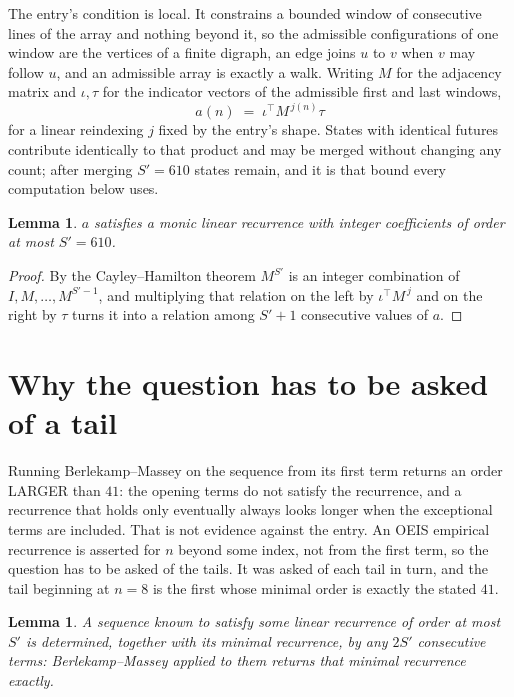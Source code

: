 \documentclass[11pt,a4paper]{article}
\theoremstyle{plain}
\newtheorem{lemma}[theorem]{Lemma}
\theoremstyle{definition}
\begin{document}
The entry's condition is local. It constrains a bounded window of consecutive lines of the
array and nothing beyond it, so the admissible configurations of one window are the vertices of
a finite digraph, an edge joins $u$ to $v$ when $v$ may follow $u$, and an admissible array is
exactly a walk. Writing $M$ for the adjacency matrix and $\iota,\tau$ for the indicator vectors
of the admissible first and last windows,
\[
a(n)\;=\;\iota^{\!\top}M^{\,j(n)}\tau
\]
for a linear reindexing $j$ fixed by the entry's shape. States with identical futures
contribute identically to that product and may be merged without changing any count; after
merging $S'=610$ states remain, and it is that bound every computation below uses.

\begin{lemma}\label{lem:cf}
$a$ satisfies a monic linear recurrence with integer coefficients of order at most $S'=610$.
\end{lemma}

\begin{proof}
By the Cayley--Hamilton theorem $M^{S'}$ is an integer combination of $I,M,\dots,M^{S'-1}$,
and multiplying that relation on the left by $\iota^{\!\top}M^{\,j}$ and on the right by
$\tau$ turns it into a relation among $S'+1$ consecutive values of $a$.
\end{proof}

\section{Why the question has to be asked of a tail}

Running Berlekamp--Massey on the sequence from its first term returns an order LARGER than $41$: the opening terms do not satisfy the recurrence, and a recurrence that holds only eventually always looks longer when the exceptional terms are included. That is not evidence against the entry. An OEIS empirical recurrence is asserted for $n$ beyond some index, not from the first term, so the question has to be asked of the tails. It was asked of each tail in turn, and the tail beginning at $n=8$ is the first whose minimal order is exactly the stated $41$.

\begin{lemma}\label{lem:bm}
A sequence known to satisfy some linear recurrence of order at most $S'$ is determined,
together with its minimal recurrence, by any $2S'$ consecutive terms: Berlekamp--Massey applied
to them returns that minimal recurrence exactly.
\end{lemma}
\end{document}
